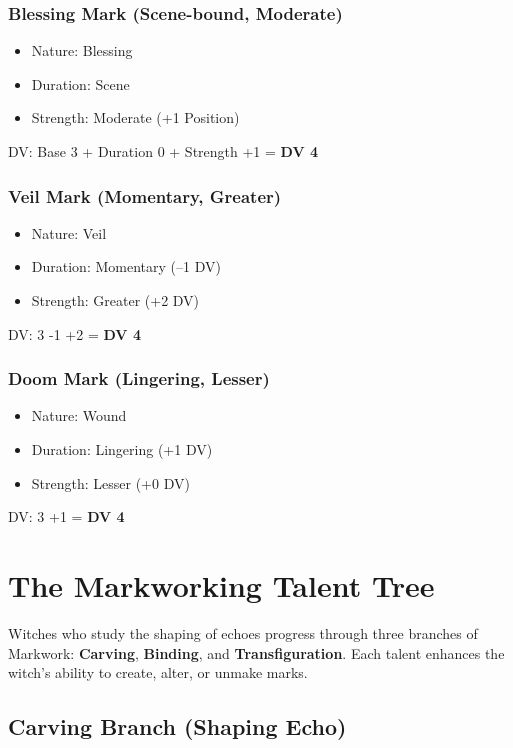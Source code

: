 \documentclass[11pt]{book}
\begin{document}
\subsubsection*{Blessing Mark (Scene-bound, Moderate)}
\begin{itemize}[noitemsep]
    \item Nature: Blessing
    \item Duration: Scene
    \item Strength: Moderate (+1 Position)
\end{itemize}
DV: Base 3 + Duration 0 + Strength +1 = \textbf{DV 4}

\subsubsection*{Veil Mark (Momentary, Greater)}
\begin{itemize}[noitemsep]
    \item Nature: Veil
    \item Duration: Momentary (--1 DV)
    \item Strength: Greater (+2 DV)
\end{itemize}
DV: 3 -1 +2 = \textbf{DV 4}

\subsubsection*{Doom Mark (Lingering, Lesser)}
\begin{itemize}[noitemsep]
    \item Nature: Wound
    \item Duration: Lingering (+1 DV)
    \item Strength: Lesser (+0 DV)
\end{itemize}
DV: 3 +1 = \textbf{DV 4}

\section*{The Markworking Talent Tree}

Witches who study the shaping of echoes progress through three branches of Markwork:
\textbf{Carving}, \textbf{Binding}, and \textbf{Transfiguration}.  
Each talent enhances the witch's ability to create, alter, or unmake marks.

\subsection*{Carving Branch (Shaping Echo)}
\end{document}
